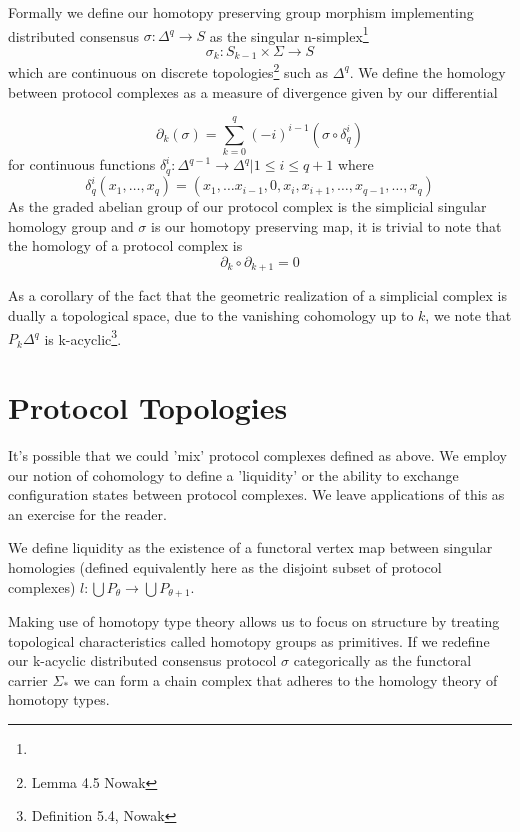 \documentclass{article}
\begin{document}
Formally we define our homotopy preserving group morphism implementing distributed consensus $\sigma: \Delta^q \rightarrow S$ as the singular n-simplex\footnote{}
\begin{equation} \label{eq1}
\sigma_k: S_{k-1} \times \Sigma \rightarrow S
\end{equation} \label{eq1}
which are continuous on discrete topologies\footnote{Lemma 4.5 Nowak} such as $\Delta^q$. We define the homology between protocol complexes as a measure of divergence given by our differential 

\begin{equation} \label{eq1}
\partial_k(\sigma) = \sum^{q}_{k=0} (-i)^{i-1}(\sigma \circ \delta_q^{i} )
\end{equation} \label{eq1}
for continuous functions $\delta^{i}_q: \Delta^{q-1} \rightarrow \Delta^q | 1 \leq i \leq q+1$ where 
\begin{equation} \label{eq1}
\delta^{i}_q(x_1, \dots, x_q) = (x_1, \dots x_{i-1}, 0, x_i, x_{i+1}, \dots, x_{q-1}, \dots, x_q)
\end{equation} \label{eq1}
As the graded abelian group of our protocol complex is the simplicial singular homology group and $\sigma$ is our homotopy preserving map, it is trivial to note that the homology of a protocol complex is 
\begin{equation} \label{eq1}
\partial_k \circ \partial_{k+1} = 0
\end{equation} \label{eq1}

As a corollary of the fact that the geometric realization of a simplicial complex is dually a topological space, due to the vanishing cohomology up to $k$, we note that $P_k\Delta^q$ is k-acyclic\footnote{Definition 5.4, Nowak}.

\section{Protocol Topologies}
It's possible that we could 'mix' protocol complexes defined as above. We employ our notion of cohomology to define a 'liquidity' or the ability to exchange configuration states between protocol complexes. We leave applications of this as an exercise for the reader.

We define liquidity as the existence of a functoral vertex map between singular homologies (defined equivalently here as the disjoint subset of protocol complexes) $l: \bigcup P_{\theta} \rightarrow \bigcup P_{\theta+1}$.

Making use of homotopy type theory allows us to focus on structure by treating topological characteristics called homotopy groups as primitives. If we redefine our k-acyclic distributed consensus protocol $\sigma$ categorically as the functoral carrier $\Sigma_{*}$  we can form a chain complex that adheres to the homology theory of homotopy types.
\end{document}
